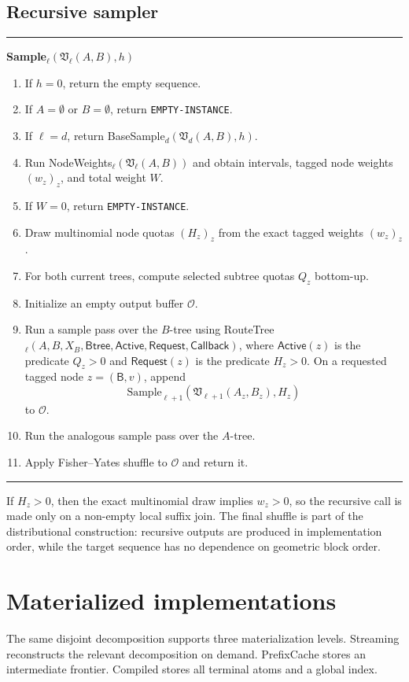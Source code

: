 \documentclass[11pt]{article}
\newcommand{\code}[1]{\texttt{#1}}
\newcommand{\Callback}{\ensuremath{\mathsf{Callback}}}
\newcommand{\Request}{\ensuremath{\mathsf{Request}}}
\newcommand{\Active}{\ensuremath{\mathsf{Active}}}
\newcommand{\Btree}{\ensuremath{\mathsf{Btree}}}
\newcommand{\sideB}{\ensuremath{\mathsf B}}
\theoremstyle{definition}
\newenvironment{algorithmbox}[1]{%
  \par\medskip\noindent\hrule\smallskip
  \noindent\textbf{#1}\par\smallskip
  \begin{enumerate}[leftmargin=1.7em,itemsep=2pt,topsep=2pt]
}{%
  \end{enumerate}
  \smallskip\hrule\medskip
}
\begin{document}
\subsection{Recursive sampler}

\begin{algorithmbox}{Sample$_\ell(\mathfrak V_\ell(A,B),h)$}
\item If $h=0$, return the empty sequence.
\item If $A=\emptyset$ or $B=\emptyset$, return \code{EMPTY-INSTANCE}.
\item If $\ell=d$, return BaseSample$_d(\mathfrak V_d(A,B),h)$.
\item Run NodeWeights$_\ell(\mathfrak V_\ell(A,B))$ and obtain intervals, tagged node weights $(w_z)_z$, and total weight $W$.
\item If $W=0$, return \code{EMPTY-INSTANCE}.
\item Draw multinomial node quotas $(H_z)_z$ from the exact tagged weights $(w_z)_z$.
\item For both current trees, compute selected subtree quotas $Q_z$ bottom-up.
\item Initialize an empty output buffer $\mathcal O$.
\item Run a sample pass over the $B$-tree using RouteTree$_\ell(A,B,X_B,\Btree,\Active,\Request,\Callback)$, where $\Active(z)$ is the predicate $Q_z>0$ and $\Request(z)$ is the predicate $H_z>0$.  On a requested tagged node $z=(\sideB,v)$, append
\[
  \mathrm{Sample}_{\ell+1}(\mathfrak V_{\ell+1}(A_z,B_z),H_z)
\]
to $\mathcal O$.
\item Run the analogous sample pass over the $A$-tree.
\item Apply Fisher--Yates shuffle to $\mathcal O$ and return it.
\end{algorithmbox}

If $H_z>0$, then the exact multinomial draw implies $w_z>0$, so the recursive call is made only on a non-empty local suffix join.  The final shuffle is part of the distributional construction: recursive outputs are produced in implementation order, while the target sequence has no dependence on geometric block order.

\section{Materialized implementations}
\label{sec:materialized}

The same disjoint decomposition supports three materialization levels.  Streaming reconstructs the relevant decomposition on demand.  PrefixCache stores an intermediate frontier.  Compiled stores all terminal atoms and a global index.
\end{document}
